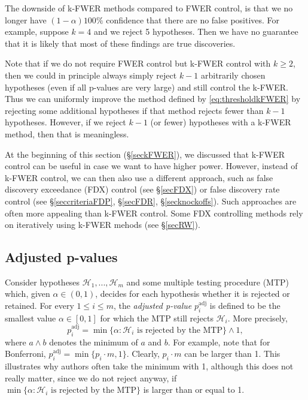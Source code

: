 \documentclass[11pt]{article}
\theoremstyle{plain}
\theoremstyle{definition}
\newcommand{\Hy}{\mathcal{H}}
\begin{document}
The downside of k-FWER methods compared to FWER control, is that we no longer have $(1-\alpha)100\%$ confidence that there are no false positives. For example, suppose $k=4$ and we reject 5 hypotheses. Then we have no guarantee that it is likely that most of these findings are true discoveries. 

Note that if we do not require FWER control but k-FWER control with $k\geq 2$, then we could in principle always simply reject $k-1$ arbitrarily chosen hypotheses (even if all p-values are very large) and still control the k-FWER.
Thus we can uniformly improve the method defined by \eqref{eq:thresholdkFWER} by rejecting some additional hypotheses if that method rejects fewer than $k-1$ hypotheses.
However, if we reject $k-1$ (or fewer) hypotheses with a k-FWER method, then that is meaningless.

 
 At the beginning of this section (\S \ref{seckFWER}), we discussed that k-FWER control can be useful in case we want to have higher power. However, instead of  k-FWER control, we can then also use a different approach, such as false discovery exceedance (FDX) control (see \S\ref{secFDX}) or false discovery rate control (see \S \ref{seccriteriaFDP}, \S\ref{secFDR}, \S\ref{secknockoffs}). Such approaches are often more appealing than k-FWER control.  Some FDX controlling methods  rely on iteratively using k-FWER mehods (see \S\ref{secRW}).  %








\subsection{Adjusted p-values} \label{secadj}
Consider hypotheses $\Hy_1,...,\Hy_m$ and some multiple testing procedure (MTP) which, given $\alpha\in(0,1)$, decides for each  hypothesis  whether it is rejected or retained. 
For every  $1\leq i \leq m$, the \emph{adjusted p-value} $p^{\text{adj}}_i$ is defined to be the smallest value $\alpha\in[0,1]$ for which the MTP still rejects $\Hy_i$. More precisely, 
$$p^{\text{adj}}_i  = \min\{\alpha: \Hy_i \text{ is rejected by the MTP}\}\wedge 1 ,$$
where $a\wedge b$ denotes the minimum of $a$ and $b$.
For example, note that for Bonferroni, $p^{\text{adj}}_i = \min\{p_i\cdot m,1\}$.
Clearly, $p_i\cdot m$ can be larger than 1. This illustrates why authors often take  the minimum with 1, although this does not really matter, since we do not reject anyway, if $\min\{\alpha: \Hy_i \text{ is rejected by the MTP}\}$ is larger than or equal to 1.
\end{document}
